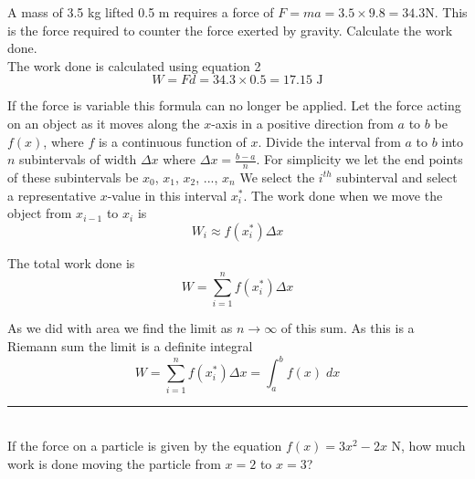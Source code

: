 \example A mass of 3.5 kg lifted 0.5 m requires a force of $\displaystyle F =m a =3.5 \times 9.8 =34.3 \mbox{N}$. This is the force required to counter the force exerted by gravity. Calculate the work done.\\
\solution The work done is calculated using equation 2
\begin{equation*}W =F d =34.3 \times 0.5 =17.15 \text{ J}
\end{equation*}

If the force is variable this formula can no longer be applied. Let the force acting on an object as it moves along the $x$-axis in a positive direction from $a$ to $b$ be $f (x)$, where $f$ is a continuous function of $x$. Divide the interval from $a$ to $b$ into $n$ subintervals of width $ \Delta x$ where $ \Delta x =\frac{b -a}{n}$. For simplicity we let the end points of these subintervals be $x_{0}$, $x_{1}$, $x_{2}$, ..., $x_{n}$ We select the $i^{t h}$ subinterval and select a representative $x$-value in this interval $x_{i}^{ \ast }$. The work done when we move the object from $x_{i -1}$ to $x_{i}$ is
\begin{equation*}W_{i} \approx f (x_{i}^{ \ast })  \Delta x
\end{equation*}

The total work done is
\begin{equation}W =\sum _{i =1}^{n}f (x_{i}^{ \ast })  \Delta x\tag{3}
\end{equation}

As we did with area we find the limit as $n \rightarrow \infty $ of this sum. As this is a Riemann sum the limit is a definite integral
\begin{equation}W =\sum _{i =1}^{n}f (x_{i}^{ \ast })  \Delta x =\int _{a}^{b}f (x)\; d x\tag{4}
\end{equation}
\rule{6.8cm}{0.5pt}\\
\example If the force on a particle is given by the equation $f (x) =3 x^{2} -2 x \text{ N}$, how much work is done moving the particle from $x =2$ to $x =3$?

